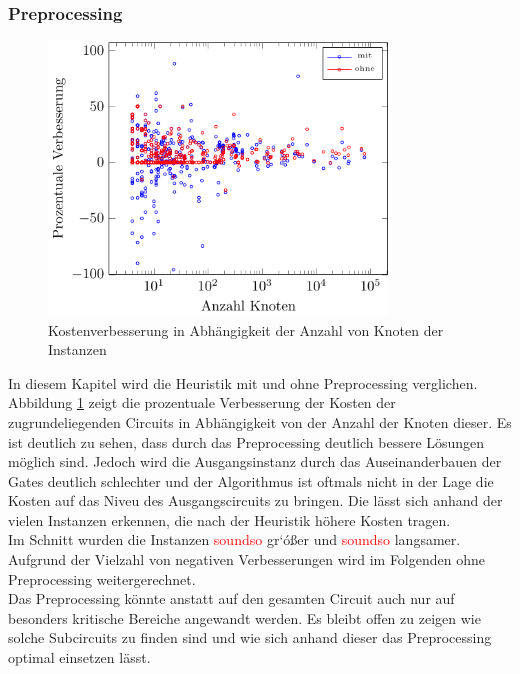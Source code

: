 \documentclass[11pt, a4paper, german]{article}
\begin{document}
\subsubsection{Preprocessing}
\begin{figure}[h]
		\centering
		\includegraphics[width = 9cm]{pictures/tex_files/analysis/decomp_test}
		\caption{Kostenverbesserung in Abh\"angigkeit der Anzahl von Knoten der Instanzen}
		\label{bild:decomp_test}
\end{figure}
In diesem Kapitel wird die Heuristik mit und ohne Preprocessing verglichen. Abbildung \ref{bild:decomp_test} zeigt die prozentuale Verbesserung der Kosten der zugrundeliegenden Circuits in Abh\"angigkeit von der Anzahl der Knoten dieser. Es ist deutlich zu sehen, dass durch das Preprocessing deutlich bessere L\"osungen m\"oglich sind. Jedoch wird die Ausgangsinstanz durch das Auseinanderbauen der Gates deutlich schlechter und der Algorithmus ist oftmals nicht in der Lage die Kosten auf das Niveu des Ausgangscircuits zu bringen. Die l\"asst sich anhand der vielen Instanzen erkennen, die nach der Heuristik h\"ohere Kosten tragen.\\
Im Schnitt wurden die Instanzen \textcolor{red}{soundso} gr`\'o{\ss}er und \textcolor{red}{soundso} langsamer. Aufgrund der Vielzahl von negativen Verbesserungen wird im Folgenden ohne Preprocessing weitergerechnet. \\
Das Preprocessing k\"onnte anstatt auf den gesamten Circuit auch nur auf besonders kritische Bereiche angewandt werden. Es bleibt offen zu zeigen wie solche Subcircuits zu finden sind und wie sich anhand dieser das Preprocessing optimal einsetzen l\"asst.
\end{document}

